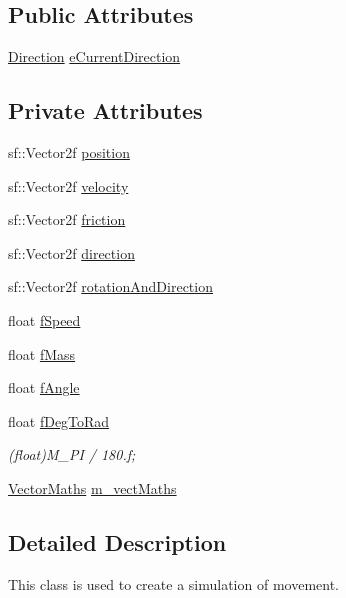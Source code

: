 \subsection*{Public Attributes}
\begin{DoxyCompactItemize}
\item 
\hyperlink{class_physics_a1a1b46dea83abe0c604a68e5445bc262}{Direction} \hyperlink{class_physics_ab58bbe849c871adc33364138e6777971}{e\+Current\+Direction}
\end{DoxyCompactItemize}
\subsection*{Private Attributes}
\begin{DoxyCompactItemize}
\item 
sf\+::\+Vector2f \hyperlink{class_physics_a6087213b48f4754b6d69d94f0bc7606c}{position}
\item 
sf\+::\+Vector2f \hyperlink{class_physics_ad8a150e8d89daeb6bcc0d3504b33b47d}{velocity}
\item 
sf\+::\+Vector2f \hyperlink{class_physics_ac40c58642c2fe90699cc49ac96501e2d}{friction}
\item 
sf\+::\+Vector2f \hyperlink{class_physics_a36bdbab2b563f5f5676f80780bec1207}{direction}
\item 
sf\+::\+Vector2f \hyperlink{class_physics_adc767d131b02d48ef12a87f9be293cb8}{rotation\+And\+Direction}
\item 
float \hyperlink{class_physics_a92809fe4df116f0a8c39ffd0c78ce25d}{f\+Speed}
\item 
float \hyperlink{class_physics_ac3484295b9b951d5a44105dd307f6043}{f\+Mass}
\item 
float \hyperlink{class_physics_a80e4f969bbf284b0ace8261527e4b232}{f\+Angle}
\item 
float \hyperlink{class_physics_af1307fcecb1d916f395ebcbcae254eb5}{f\+Deg\+To\+Rad}
\begin{DoxyCompactList}\small\item\em (float)M\+\_\+\+PI / 180.\+f; \end{DoxyCompactList}\item 
\hyperlink{class_vector_maths}{Vector\+Maths} \hyperlink{class_physics_a5ef3c448cb1b2c02522b3aa2c3bdc521}{m\+\_\+vect\+Maths}
\end{DoxyCompactItemize}


\subsection{Detailed Description}
This class is used to create a simulation of movement. 

